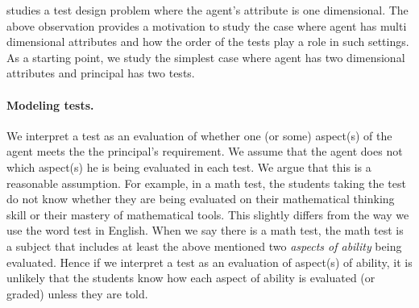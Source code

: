 \citet{perez2022test} studies a test design problem where the agent's attribute is one dimensional.
The above observation provides a motivation to study the case where agent has multi dimensional attributes and how the order of the tests play a role in such settings. 
As a starting point, we study the simplest case where agent has two dimensional attributes and principal has two tests.




\paragraph{Modeling tests.}
We interpret a test as an evaluation of whether one (or some) aspect(s) of the agent meets the the principal's requirement.
We assume that the agent does not which aspect(s) he is being evaluated in each test.
We argue that this is a reasonable assumption.
For example, in a math test, the students taking the test do not know whether they are being evaluated on their mathematical thinking skill or their mastery of mathematical tools.
This slightly differs from the way we use the word test in English.
When we say there is a math test, the math test is a subject that includes at least the above mentioned two \emph{aspects of ability} being evaluated.
Hence if we interpret a test as an evaluation of aspect(s) of ability, it is unlikely that the students know how each aspect of ability is evaluated (or graded) unless they are told.


